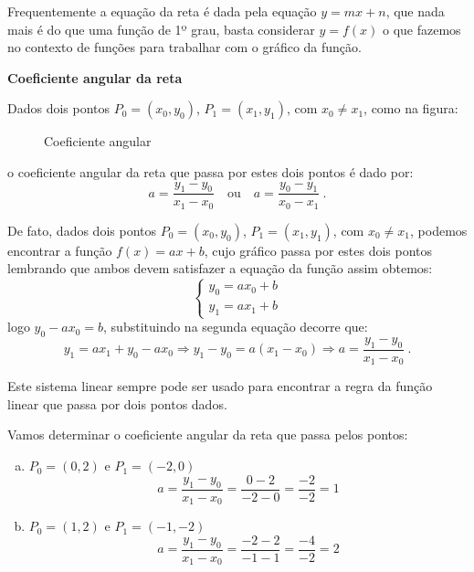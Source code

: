 \begin{itemize}
 Frequentemente a equação da reta é dada pela equação $y=mx+n$, que nada mais é do que uma função de 1º grau, basta considerar $y=f(x)$ o que fazemos no contexto de funções para trabalhar com o gráfico da função.
 
 \textbf{Coeficiente angular da reta}
 
  Dados dois pontos $P_0=(x_0, y_0)$, $P_1=(x_1, y_1)$, com $x_0 \neq x_1$, como na figura:
 
 \begin{figure}[H]
 \centering
    \caption{Coeficiente angular}
  \end{figure}
  
  o coeficiente angular da reta que passa por estes dois pontos é dado por:
  \[a= \frac{y_1 - y_0}{x_1 - x_0} \ \ \ \text{ ou } \ \ \ a= \frac{y_0 - y_1}{x_0 - x_1} \ .\]
  
  De fato, dados dois pontos $P_0=(x_0, y_0)$, $P_1=(x_1, y_1)$, com $x_0 \neq x_1$, podemos encontrar a função $f(x)= ax+b$, cujo gráfico passa por estes dois pontos lembrando que ambos devem satisfazer a equação da função assim obtemos:
  \[ \begin{cases}
   y_0= ax_0 + b \\
   y_1= ax_1 + b
  \end{cases} \]
  logo $y_0 - ax_0= b$, substituindo na segunda equação decorre que:
  \[y_1= ax_1 + y_0 - ax_0 \Rightarrow y_1 - y_0= a(x_1 - x_0) \Rightarrow a= \frac{y_1 - y_0}{x_1 - x_0} \ . \]
  
  Este sistema linear sempre pode ser usado para encontrar a regra da função linear que passa por dois pontos dados.

  
  \begin{exem}
  Vamos determinar o coeficiente angular da reta que passa pelos pontos:
   \begin{enumerate}[a)]
    \item $P_0=(0,2)$ e $P_1=(-2,0)$
    \[a= \frac{y_1 - y_0}{x_1 - x_0}= \frac{0 - 2}{-2 - 0}= \frac{-2}{-2}= 1\]
    \item $P_0=(1,2)$ e $P_1=(-1,-2)$
    \[a= \frac{y_1 - y_0}{x_1 - x_0}= \frac{-2 - 2}{-1 - 1}= \frac{-4}{-2}= 2\]
   \end{enumerate}


\end{exem}
\end{itemize}

